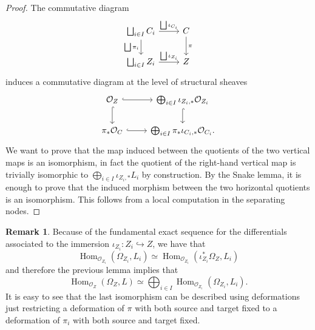 \documentclass{alggeom}
\numberwithin{equation}{section}
\numberwithin{subsection}{section}
\theoremstyle{definition}
\newtheorem{remark}[theorem]{Remark}
\theoremstyle{remark}
\newcommand\cO{\mathcal{O}} \newcommand\cP{\mathcal{P}}
\renewcommand\hom{\operatorname{Hom}}
\begin{document}
\begin{proof}
 
The commutative diagram
$$\begin{tikzcd}
\bigsqcup_{i \in I} C_i \arrow[r, "\bigsqcup \iota_{C_i}"] \arrow[d, "\bigsqcup \pi_i"'] & C \arrow[d, "\pi"] \\
\bigsqcup_{i\in I}Z_i \arrow[r, "\bigsqcup \iota_{Z_i}"]                    & Z                 
\end{tikzcd}
$$ 
 induces a commutative diagram at the level of structural sheaves
$$
\begin{tikzcd}
\cO_Z \arrow[r, hook] \arrow[d, hook] & \bigoplus_{i \in I} \iota_{Z_i,*}\cO_{Z_i} \arrow[d, hook] \\
\pi_*\cO_{C} \arrow[r, hook]          & \bigoplus_{i \in I}\pi_*\iota_{C_i,*}\cO_{C_i}.                 
\end{tikzcd}
$$ 
We want to prove that the map induced between the quotients of the two vertical maps is an isomorphism, in fact the quotient of the right-hand vertical map is trivially isomorphic to $\bigoplus_{i \in I} \iota_{Z_i,*}L_i$ by construction. By the Snake lemma, it is enough to prove that the induced morphism between the two horizontal quotients is an isomorphism. This follows from a local computation in the separating nodes.   
\end{proof}

\begin{remark}
	Because of the fundamental exact sequence for the differentials associated to the immersion $\iota_{Z_i}:Z_i\hookrightarrow Z$, we have that 
	$$ \hom_{\cO_{Z_i}}(\Omega_{Z_i},L_i)\simeq  \hom_{\cO_{Z_i}}(\iota_{Z_i}^*\Omega_{Z},L_i)$$
	and therefore the previous lemma implies that 
	$$ \hom_{\cO_Z}(\Omega_Z,L) \simeq \bigoplus_{i \in I} \hom_{\cO_{Z_i}}(\Omega_{Z_i},L_{i}).$$
	It is easy to see that the last isomorphism can be described using deformations just restricting a deformation of $\pi$ with both source and target fixed to a deformation of $\pi_i$ with both source and target fixed.
	
\end{remark}
\end{document}
